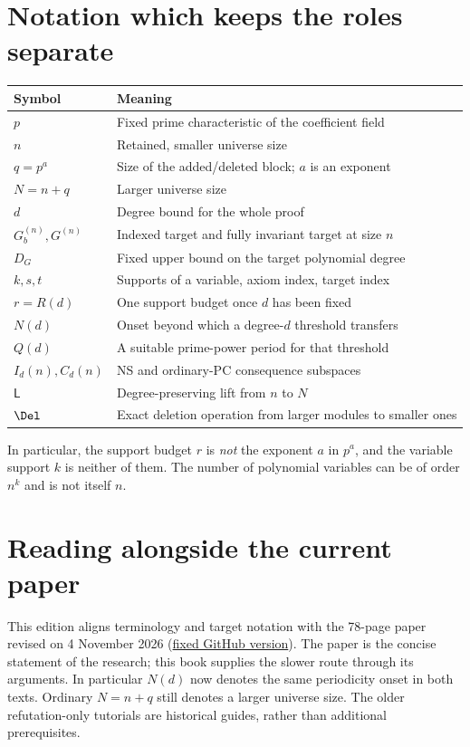 \section*{Notation which keeps the roles separate}
\begin{center}
\begin{tabular}{@{}ll@{}}
\toprule
Symbol & Meaning\\
\midrule
$p$ & Fixed prime characteristic of the coefficient field\\
$n$ & Retained, smaller universe size\\
$q=p^a$ & Size of the added/deleted block; $a$ is an exponent\\
$N=n+q$ & Larger universe size\\
$d$ & Degree bound for the whole proof\\
$G_b^{(n)},G^{(n)}$ & Indexed target and fully invariant target at size $n$\\
$D_G$ & Fixed upper bound on the target polynomial degree\\
$k,s,t$ & Supports of a variable, axiom index, target index\\
$r=R(d)$ & One support budget once $d$ has been fixed\\
$N(d)$ & Onset beyond which a degree-$d$ threshold transfers\\
$Q(d)$ & A suitable prime-power period for that threshold\\
$I_d(n),C_d(n)$ & NS and ordinary-PC consequence subspaces\\
$\mathsf L$ & Degree-preserving lift from $n$ to $N$\\
$\Del$ & Exact deletion operation from larger modules to smaller ones\\
\bottomrule
\end{tabular}
\end{center}
In particular, the support budget $r$ is \emph{not} the exponent $a$
in $p^a$, and the variable support $k$ is neither of them. The number
of polynomial variables can be of order $n^k$ and is not itself $n$.

\section*{Reading alongside the current paper}
This edition aligns terminology and target notation with the
78-page paper revised on 4 November 2026
(\href{https://github.com/SR123/degree-profiles-linear-bounds/blob/9e7cea1064f28f7e2ffd5eab44d52bfa854c5baa/paper/paper.pdf}{fixed GitHub version}). The paper
is the concise statement of the research; this book supplies the slower
route through its arguments. In particular $N(d)$ now denotes the
same periodicity onset in both texts. Ordinary $N=n+q$ still denotes
a larger universe size. The older refutation-only tutorials are
historical guides, rather than additional prerequisites.

